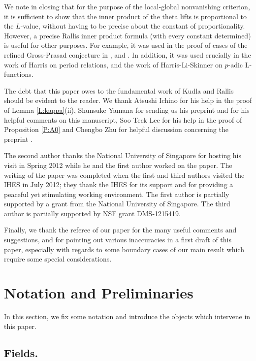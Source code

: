 \documentclass[10pt]{amsart}
\theoremstyle{plain}
\numberwithin{equation}{section}
\begin{document}
We note in closing that for the purpose of the local-global
nonvanishing criterion, it is  sufficient to show that the inner
product of the theta lifts is proportional to the $L$-value, without
having to be precise about the constant of proportionality. However,
a precise Rallis inner product formula (with every constant
determined) is useful for other purposes. For example, it was used in
the proof of cases of the refined Gross-Prasad conjecture in
\cite{GI1}, \cite{Ha} and \cite{Q}. In addition, it was used crucially in the work of Harris on
period relations, and the work of Harris-Li-Skinner \cite{HLS} on $p$-adic
L-functions.   

\vskip 10pt

 The debt that this paper owes to the
fundamental work of Kudla and Rallis should be evident to the reader. 
 We thank Atsushi Ichino for  his help in the proof of Lemma
 \ref{L:kappa}(ii), Shunsuke Yamana for sending us his preprint
 \cite{Y4} and for his helpful comments on this manuscript, Soo Teck Lee for his help in the proof of Proposition
 \ref{P:A0} and Chengbo Zhu for helpful discussion concerning the preprint \cite{LZ4}. 
\vskip 5pt

The second author thanks the National University of Singapore for
hosting his visit in Spring 2012 while he and the first author worked
on the paper.  The writing of the paper was completed when the first
and third authors visited the IHES in July 2012; they thank the IHES
for its support and for providing a peaceful yet stimulating working
environment. The first author is partially supported by a grant from
the National University of Singapore. The third author is partially
supported by NSF grant DMS-1215419. 

\vskip 5pt

Finally, we thank the referee of our paper for the many useful comments and suggestions, and for pointing out various inaccuracies in a first draft of this paper, especially with regards to some boundary cases of our main result which require some special considerations. 
\vskip 15pt

 
 \section{\bf Notation and Preliminaries} \label{S:notation}
 
 In this section, we fix some notation and introduce the objects which
 intervene in this paper.
 
 \subsection{\bf Fields.}
 
\end{document}
